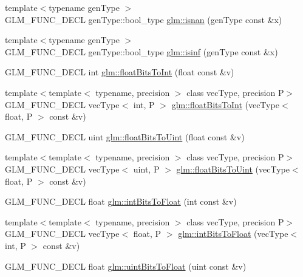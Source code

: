 \begin{DoxyCompactItemize}
\item 
{\footnotesize template$<$typename gen\-Type $>$ }\\G\-L\-M\-\_\-\-F\-U\-N\-C\-\_\-\-D\-E\-C\-L gen\-Type\-::bool\-\_\-type \hyperlink{group__core__func__common_ga8a9dec5200888766fbcb51b6a5898728}{glm\-::isnan} (gen\-Type const \&x)
\item 
{\footnotesize template$<$typename gen\-Type $>$ }\\G\-L\-M\-\_\-\-F\-U\-N\-C\-\_\-\-D\-E\-C\-L gen\-Type\-::bool\-\_\-type \hyperlink{group__core__func__common_ga9fce6a337c7e8ad089b9dc17c70cb873}{glm\-::isinf} (gen\-Type const \&x)
\item 
G\-L\-M\-\_\-\-F\-U\-N\-C\-\_\-\-D\-E\-C\-L int \hyperlink{group__core__func__common_gadc6a536a7bef046c3293d2ccad6d9ca2}{glm\-::float\-Bits\-To\-Int} (float const \&v)
\item 
{\footnotesize template$<$template$<$ typename, precision $>$ class vec\-Type, precision P$>$ }\\G\-L\-M\-\_\-\-F\-U\-N\-C\-\_\-\-D\-E\-C\-L vec\-Type$<$ int, P $>$ \hyperlink{group__core__func__common_gac4a0710238ae54c67931dd29a0b0f873}{glm\-::float\-Bits\-To\-Int} (vec\-Type$<$ float, P $>$ const \&v)
\item 
G\-L\-M\-\_\-\-F\-U\-N\-C\-\_\-\-D\-E\-C\-L uint \hyperlink{group__core__func__common_ga748b4d2819b48d28ca09dc8733488873}{glm\-::float\-Bits\-To\-Uint} (float const \&v)
\item 
{\footnotesize template$<$template$<$ typename, precision $>$ class vec\-Type, precision P$>$ }\\G\-L\-M\-\_\-\-F\-U\-N\-C\-\_\-\-D\-E\-C\-L vec\-Type$<$ uint, P $>$ \hyperlink{group__core__func__common_ga1804d4c443605d8a27be644aa461afe4}{glm\-::float\-Bits\-To\-Uint} (vec\-Type$<$ float, P $>$ const \&v)
\item 
G\-L\-M\-\_\-\-F\-U\-N\-C\-\_\-\-D\-E\-C\-L float \hyperlink{group__core__func__common_ga2650dc57b2148a6ffbce20944fb4d97a}{glm\-::int\-Bits\-To\-Float} (int const \&v)
\item 
{\footnotesize template$<$template$<$ typename, precision $>$ class vec\-Type, precision P$>$ }\\G\-L\-M\-\_\-\-F\-U\-N\-C\-\_\-\-D\-E\-C\-L vec\-Type$<$ float, P $>$ \hyperlink{group__core__func__common_gad21ab176dd0e6b59d923db5efca87f4e}{glm\-::int\-Bits\-To\-Float} (vec\-Type$<$ int, P $>$ const \&v)
\item 
G\-L\-M\-\_\-\-F\-U\-N\-C\-\_\-\-D\-E\-C\-L float \hyperlink{group__core__func__common_ga97464ca9ff4267de30ea408f700d4ca8}{glm\-::uint\-Bits\-To\-Float} (uint const \&v)

\end{DoxyCompactItemize}

